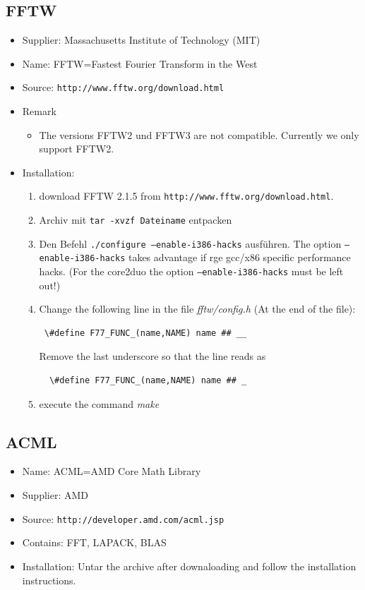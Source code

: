 \documentclass[a4paper,10pt]{report}
\newcommand{\mytt}[1]{{\tt #1}}
\begin{document}
\subsection{FFTW}
\label{sec:FFTWinstall}
\begin{itemize}
\item Supplier: Massachusetts Institute of Technology (MIT)
\item Name: FFTW=Fastest Fourier Transform in the West
\item Source: \mytt{http://www.fftw.org/download.html}
\item Remark
\begin{itemize}
\item The versions FFTW2 und FFTW3 are not compatible. Currently we only support FFTW2.
\end{itemize}
\item Installation:
\begin{enumerate}
\item download FFTW 2.1.5 from \mytt{http://www.fftw.org/download.html}.
\item Archiv mit \mytt{tar -xvzf Dateiname} entpacken
 \item Den Befehl \mytt{./configure --enable-i386-hacks} ausf\"uhren.
 The option \mytt{--enable-i386-hacks} takes advantage if rge gcc/x86
 specific performance hacks. (For the core2duo the option
 \mytt{--enable-i386-hacks} must be left out!)
\item Change the following line in the file \textit{fftw/config.h} (At the end of the file):\\
\begin{verbatim}
 \#define F77_FUNC_(name,NAME) name ## __
\end{verbatim}
 Remove the last underscore so that the line reads as
\begin{verbatim}
  \#define F77_FUNC_(name,NAME) name ## _ 
\end{verbatim}
 \item  execute the command \textit{make}
\end{enumerate}
\end{itemize}


\subsection{ACML}
\label{sec:acml}
\begin{itemize}
\item Name: ACML=AMD Core Math Library
\item Supplier: AMD
\item Source: \mytt{http://developer.amd.com/acml.jsp}
\item Contains: FFT, LAPACK, BLAS
\item Installation: Untar the archive after downaloading and follow
the installation instructions.
\end{itemize}
\end{document}
